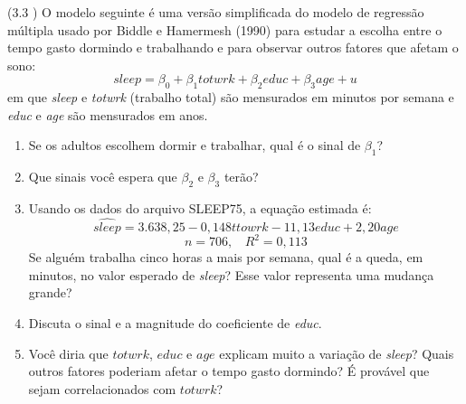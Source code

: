 \documentclass[12pt,letterpaper, onecolumn]{exam}
\begin{document}
\begin{questions}
    
    \question (3.3 \citep{wooldridge2016}) O modelo seguinte é uma versão simplificada do modelo de regressão múltipla usado por Biddle e Hamermesh (1990) para estudar a escolha entre o tempo gasto dormindo e trabalhando e para observar outros fatores que afetam o sono:\begin{equation*}
        sleep = \beta_0 + \beta_1 totwrk + \beta_2educ + \beta_3age + u
    \end{equation*} em que \textit{sleep} e \textit{totwrk} (trabalho total) são mensurados em minutos por semana e \textit{educ} e \textit{age} são mensurados em anos.
    \begin{enumerate}[label=(\alph*)]
    \item Se os adultos escolhem dormir e trabalhar, qual é o sinal de $\beta_1$?
    \item Que sinais você espera que $\beta_2$ e $\beta_3$ terão?
    \item Usando os dados do arquivo SLEEP75, a equação estimada é:\begin{equation*} 
                \widehat{sleep} = 3.638,25 - 0,148ttowrk - 11,13educ + 2,20 age \end{equation*}\begin{equation*}                n = 706, \ \ \ \ R^2 = 0,113 
    \end{equation*} Se alguém trabalha cinco horas a mais por semana, qual é a queda, em minutos, no valor esperado de \textit{sleep}? Esse valor representa uma mudança grande?
    \item Discuta o sinal e a magnitude do coeficiente de \textit{educ}.
    \item Você diria que $totwrk$, $educ$ e $age$ explicam muito a variação de \textit{sleep}? Quais outros fatores poderiam afetar o tempo gasto dormindo? É provável que sejam correlacionados com $totwrk$?
    
    \end{enumerate}


\
\



\end{questions}
\end{document}
